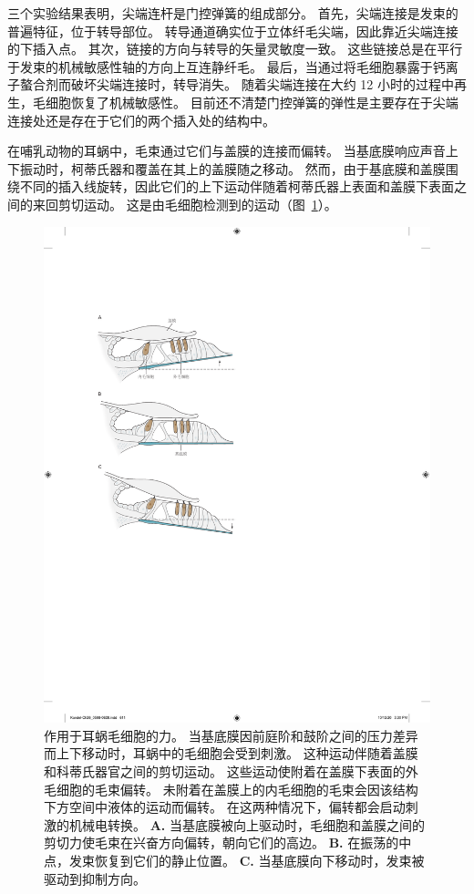 三个实验结果表明，尖端连杆是门控弹簧的组成部分。
首先，尖端连接是发束的普遍特征，位于转导部位。
转导通道确实位于立体纤毛尖端，因此靠近尖端连接的下插入点。
其次，链接的方向与转导的矢量灵敏度一致。
这些链接总是在平行于发束的机械敏感性轴的方向上互连静纤毛。
最后，当通过将毛细胞暴露于钙离子螯合剂而破坏尖端连接时，转导消失。
随着尖端连接在大约 12 小时的过程中再生，毛细胞恢复了机械敏感性。
目前还不清楚门控弹簧的弹性是主要存在于尖端连接处还是存在于它们的两个插入处的结构中。


在哺乳动物的耳蜗中，毛束通过它们与盖膜的连接而偏转。
当基底膜响应声音上下振动时，柯蒂氏器和覆盖在其上的盖膜随之移动。
然而，由于基底膜和盖膜围绕不同的插入线旋转，因此它们的上下运动伴随着柯蒂氏器上表面和盖膜下表面之间的来回剪切运动。
这是由毛细胞检测到的运动（图~\ref{fig:26_9}）。


\begin{figure}[htbp]
	\centering
	\includegraphics[width=0.65\linewidth]{chap26/fig_26_9}
	\caption{作用于耳蜗毛细胞的力。
		当基底膜因前庭阶和鼓阶之间的压力差异而上下移动时，耳蜗中的毛细胞会受到刺激。
		这种运动伴随着盖膜和科蒂氏器官之间的剪切运动。 
		这些运动使附着在盖膜下表面的外毛细胞的毛束偏转。
		未附着在盖膜上的内毛细胞的毛束会因该结构下方空间中液体的运动而偏转。
		在这两种情况下，偏转都会启动刺激的机械电转换。
		\textbf{A.} 当基底膜被向上驱动时，毛细胞和盖膜之间的剪切力使毛束在兴奋方向偏转，朝向它们的高边。
		\textbf{B.} 在振荡的中点，发束恢复到它们的静止位置。
		\textbf{C.} 当基底膜向下移动时，发束被驱动到抑制方向。}
	\label{fig:26_9}
\end{figure}


